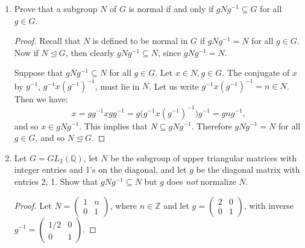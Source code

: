 \documentclass{article}
\begin{document}
\begin{enumerate}[label=(\alph*), itemsep=0em]
    \item Prove that a subgroup $N$ of $G$ is normal if and only if $gNg^{-1} \subseteq G$ for all $g \in G$.
          \begin{proof}
            Recall that $N$ is defined to be normal in $G$ if $gNg^{-1} = N$ for all $g \in G$. Now if $N \unlhd G$, then clearly $gNg^{-1} \subseteq N$, since $gNg^{-1} = N$.

            Suppose that $gNg^{-1} \subseteq N$ for all $g \in G$. Let $x \in N, g \in G$. The conjugate of $x$ by $g^{-1}$, $g^{-1}x(g^{-1})^{-1}$, must lie in $N$. Let us write $g^{-1}x(g^{-1})^{-1} = n \in N$. Then we have:
            \begin{equation*}
                x = gg^{-1}xgg^{-1} = g\bigl(g^{-1}x(g^{-1})^{-1}\bigr)g^{-1} = gng^{-1},
            \end{equation*}
            and so $x \in gNg^{-1}$. This implies that $N \subseteq gNg^{-1}$. Therefore $gNg^{-1} = N$ for all $g \in G$, and so $N \unlhd G$.
          \end{proof}
    \item Let $G = GL_2(\mathbb{Q})$, let $N$ be the subgroup of upper triangular matrices with integer entries and 1's on the diagonal, and let $g$ be the diagonal matrix with entries 2, 1. Show that $gNg^{-1} \subseteq N$ but $g$ does \emph{not} normalize $N$.
          \begin{proof}
            Let $N = \begin{pmatrix}1 & n \\ 0 & 1\end{pmatrix}$, where $n \in \mathbb{Z}$ and let $g = \begin{pmatrix}2 & 0 \\ 0 & 1\end{pmatrix}$, with inverse $g^{-1} = \begin{pmatrix}1/2 & 0 \\ 0 & 1\end{pmatrix}$.


\end{proof}
\end{enumerate}
\end{document}
